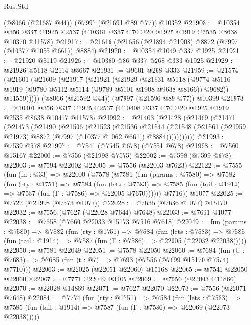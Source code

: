 \begin{lexlean}{RustStd}
\begin{coremodule}
{\begin{coremodule}
{{{{{{{{{{{{{{{{{{{{{{{{{{{{{{{{{{{{{{{{{{{    (@8066 (@21687 @44))
    (@7997 (@21691 @89 @77))
    @10352
@21908 := @10354 @356 @337 @1925 @2537 (@10361 @337 @70 @20 @1925 @1919 @2535 @8638 @10370 @11578)
@21917 := @21616 (@21656 (@21894 @21908) @8872 (@7997 (@10377 @1055 @661)) @8884)
@21920 := @10354 @1049 @337 @1925
@21921 := @21920 @5119
@21926 := @10360 @86 @337 @268 @333 @1925
@21929 := @21926 @5118 @2114 @8667
@21931 := @9601 @268 @333
@21959 := @21574
    (@21601
      (@21609
        (@21917
          (@21921
            (@21929
              (@21931
                @5118
                (@9774 @5116 @1919 (@9780 @5112 @5114 (@9789 @5101 @1908 @9638 @8166)) @9682))
              @11559)))))
    (@8066 (@21592 @44))
    (@7997 (@21596 @89 @77))
    @10399
@21973 := @10401 @356 @337 @1925 @2537 (@10408 @337 @70 @20 @1925 @1919 @2535 @8638 @10417 @11578)
@21992 := @21403
    (@21428
      (@21469
        (@21471
          (@21473
            (@21490
              (@21506
                (@21523
                  (@21536
                    (@21544
                      (@21548
                        (@21561 (@21959 @21973) @8872 (@7997 (@10377 @1062 @661)) @8884)))))))))))
@21993 := @7539 @678
@21997 := @7541 (@7545 @678) (@7551 @678)
@21998 := @7560 @15167
@22000 := @7556 (@21998 @7575)
@22002 := @7598 (@7599 @678)
@22003 := @7594 @22002
@22005 := @7556 (@22003 @7623)
@22022 := @7555
    (fun (fn : @33) =>
    @22000
      (@7578
        (@7581
          (fun (params : @7580) =>
          @7582
            (fun (rty : @1751) =>
            @7584
              (fun (lets : @7583) =>
              @7585 (fun (tail : @1914) => @7587 (fun (Γ : @7586) => @22005 @7670))))))
        @7716))
    @1077
@22025 := @7722 (@21998 (@7573 @1077))
@22028 := @7635 (@7636 @1077) @15170
@22032 := @7556 (@7627 (@22028 @7644) @7648)
@22033 := @7661 @1077
@22038 := @7658 (@7660 @22033 @15173 @7616 @7618)
@22049 := fun (params : @7580) =>
  @7582
    (fun (rty : @1751) =>
    @7584
      (fun (lets : @7583) =>
      @7585 (fun (tail : @1914) => @7587 (fun (Γ : @7586) => @22005 (@22032 @22038)))))
@22050 := @7581 @22049
@22051 := @7578 @22050
@22060 := @7684
    (fun (U : @7683) => @7685 (fun (t : @7) => @7693 (@7556 (@7699 @15170 @7574) @7710)))
@22063 := @22025 (@22051 @22060) @15168
@22065 := @7541 @22050 @22060
@22067 := @7771 @22049 @3405
@22069 := @7556 (@22003 @14866)
@22070 := @22028 @14869
@22071 := @7627 @22070
@22073 := @7556 (@22071 @7648)
@22084 := @7774
    (fun (rty : @1751) =>
    @7584
      (fun (lets : @7583) =>
      @7585 (fun (tail : @1914) => @7587 (fun (Γ : @7586) => @22069 (@22073 @22038)))))
}}}}}}}}}}}}}}}}}}}}}}}}}}}}}}}}}}}}}}}}}}}
\end{coremodule}}
\end{coremodule}
\end{lexlean}
